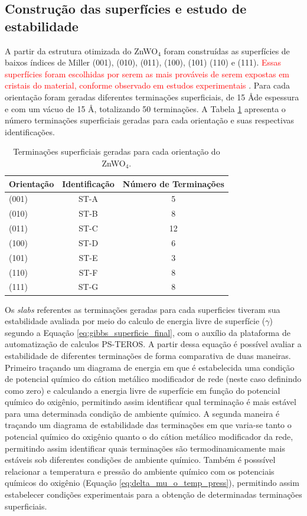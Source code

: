 \subsection{Construção das superfícies e estudo de estabilidade}
A partir da estrutura otimizada do ZnWO$_4$ foram construídas as superfícies de baixos índices de Miller (001), (010), (011), (100), (101) (110) e (111). \textcolor{red}{Essas superfícies foram escolhidas por serem as mais prováveis de serem expostas em cristais do material, conforme observado em estudos experimentais \cite{pereira2018znwo}}. Para cada orientação foram geradas diferentes terminações superficiais, de 15 \AA de espessura e com um vácuo de 15 \AA, totalizando 50 terminações. A Tabela \ref{tab:terminações_znwo4} apresenta o número terminações superficiais geradas para cada orientação e suas respectivas identificações.

\FloatBarrier
\begin{table}[!htbp]
\centering
\caption{Terminações superficiais geradas para cada orientação do ZnWO$_4$.}
\label{tab:terminações_znwo4}
\begin{tabular}{lcc}
\hline
\textbf{Orientação} & \textbf{Identificação} & \textbf{Número de Terminações}
\\ \hline
(001) & ST-A & 5 \\
(010) & ST-B & 8 \\
(011) & ST-C & 12 \\
(100) & ST-D & 6 \\
(101) & ST-E & 3 \\
(110) & ST-F & 8 \\
(111) & ST-G & 8 \\
\hline
\end{tabular}
\end{table}
\FloatBarrier

Os \textit{slabs} referentes as terminações geradas para cada superficies tiveram sua estabilidade avaliada por meio do calculo de energia livre de superfície ($\gamma$) segundo a Equação \ref{eq:gibbs_superficie_final}, com o auxílio da plataforma de automatização de calculos PS-TEROS. A partir dessa equação é possível avaliar a estabilidade de diferentes terminações de forma comparativa de duas maneiras. Primeiro traçando um diagrama de energia em que é estabelecida uma condição de potencial químico do cátion metálico modificador de rede (neste caso definindo como zero) e calculando a energia livre de superfície em função do potencial químico do oxigênio, permitindo assim identificar qual terminação é mais estável para uma determinada condição de ambiente químico. A segunda maneira é traçando um diagrama de estabilidade das terminações em que varia-se tanto o potencial químico do oxigênio quanto o do cátion metálico modificador da rede, permitindo assim identificar quais terminações são termodinamicamente mais estáveis sob diferentes condições de ambiente químico. Também é posssível relacionar a temperatura e pressão do ambiente químico com os potenciais químicos do oxigênio (Equação \ref{eq:delta_mu_o_temp_press}), permitindo assim estabelecer condições experimentais para a obtenção de determinadas terminações superficiais.



